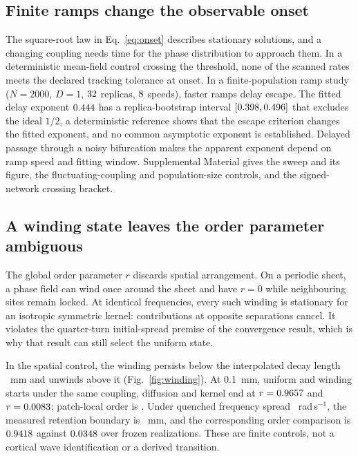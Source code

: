 \documentclass[12pt]{article}
\renewcommand{\cite}[1]{\citep{#1}}
\begin{document}
\subsection{Finite ramps change the observable onset}
\label{sec:ramp}

The square-root law in Eq.~\eqref{eq:onset} describes stationary solutions, and a changing coupling needs time for the phase distribution to approach them. In a deterministic mean-field control crossing the threshold, none of the scanned rates meets the declared tracking tolerance at onset. In a finite-population ramp study ($N=2000$, $D=1$, $32$ replicas, $8$ speeds), faster ramps delay escape. The fitted delay exponent $0.444$ has a replica-bootstrap interval $[0.398,0.496]$ that excludes the ideal $1/2$, a deterministic reference shows that the escape criterion changes the fitted exponent, and no common asymptotic exponent is established. Delayed passage through a noisy bifurcation \cite{berglund2002} makes the apparent exponent depend on ramp speed and fitting window. Supplemental Material gives the sweep and its figure, the fluctuating-coupling and population-size controls, and the signed-network crossing bracket.


\subsection{A winding state leaves the order parameter ambiguous}
\label{sec:wave}

The global order parameter $r$ discards spatial arrangement. On a periodic
sheet, a phase field can wind once around the sheet and have $r=0$ while
neighbouring sites remain locked. At identical frequencies, every such winding
is stationary for an isotropic symmetric kernel: contributions at opposite
separations cancel. It violates the quarter-turn initial-spread premise of
the convergence result, which is why that result can still select the uniform
state.

In the spatial control, the winding persists below the interpolated decay
length \waveBoundary~mm and unwinds above it (Fig.~\ref{fig:winding}). At
0.1~mm, uniform and winding starts under the same coupling, diffusion and
kernel end at $r=0.9657$ and $r=0.0083$; patch-local order
is \waveBandLocalOrder{}. Under quenched frequency spread
\waveSpread~rad\,s$^{-1}$, the measured retention boundary is
\waveSpreadBoundary~mm, and the corresponding order comparison is
$0.9418$ against $0.0348$ over
\waveSeedCount{} frozen realizations. These are finite controls, not a cortical
wave identification or a derived transition.
\end{document}
